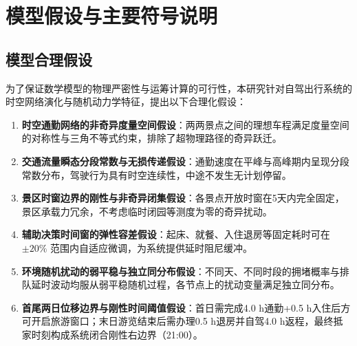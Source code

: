 \documentclass{cumcmthesis}
\begin{document}
\section{模型假设与主要符号说明}
\subsection{模型合理假设}
为了保证数学模型的物理严密性与运筹计算的可行性，本研究针对自驾出行系统的时空网络演化与随机动力学特征，提出以下合理化假设：
\begin{enumerate}
\item \textbf{时空通勤网络的非奇异度量空间假设}：两两景点之间的理想车程满足度量空间的对称性与三角不等式约束，排除了超物理路径的奇异跃迁。
\item \textbf{交通流量瞬态分段常数与无损传递假设}：通勤速度在平峰与高峰期内呈现分段常数分布，驾驶行为具有时空连续性，中途不发生无计划停留。
\item \textbf{景区时窗边界的刚性与非奇异闭集假设}：各景点开放时窗在5天内完全固定，景区承载力冗余，不考虑临时闭园等测度为零的奇异扰动。
\item \textbf{辅助决策时间窗的弹性容差假设}：起床、就餐、入住退房等固定耗时可在 $\pm 20\%$ 范围内自适应微调，为系统提供延时阻尼缓冲。
\item \textbf{环境随机扰动的弱平稳与独立同分布假设}：不同天、不同时段的拥堵概率与排队延时波动均服从弱平稳随机过程，各节点上的扰动变量满足独立同分布。
\item \textbf{首尾两日位移边界与刚性时间阈值假设}：首日需完成4.0 h通勤+0.5 h入住后方可开启旅游窗口；末日游览结束后需办理0.5 h退房并自驾4.0 h返程，最终抵家时刻构成系统闭合刚性右边界（21:00）。
\end{enumerate}
\end{document}
